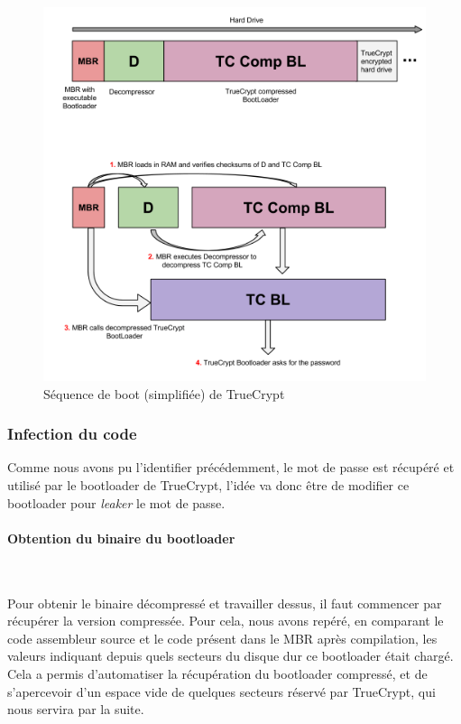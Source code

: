 \documentclass[12pt,a4paper]{article}
\begin{document}
\begin{figure}
    \centering
    \includegraphics[height=0.5\textheight]{img/tc_boot.png}
    \caption{Séquence de boot (simplifiée) de TrueCrypt}
    \label{tc_boot}
\end{figure}

\subsubsection{Infection du code}

Comme nous avons pu l'identifier précédemment, le mot de passe est récupéré et
utilisé par le bootloader de TrueCrypt, l'idée va donc être de modifier ce
bootloader pour \textit{leaker} le mot de passe.

\paragraph{Obtention du binaire du bootloader}~

Pour obtenir le binaire décompressé et travailler dessus, il faut commencer par
récupérer la version compressée. Pour cela, nous avons repéré, en comparant
le code assembleur source et le code présent dans le MBR après compilation,
les valeurs indiquant depuis quels secteurs du disque dur ce bootloader était
chargé. Cela a permis d'automatiser la récupération du bootloader compressé,
et de s'apercevoir d'un espace vide de quelques secteurs réservé par TrueCrypt,
qui nous servira par la suite.
\end{document}

